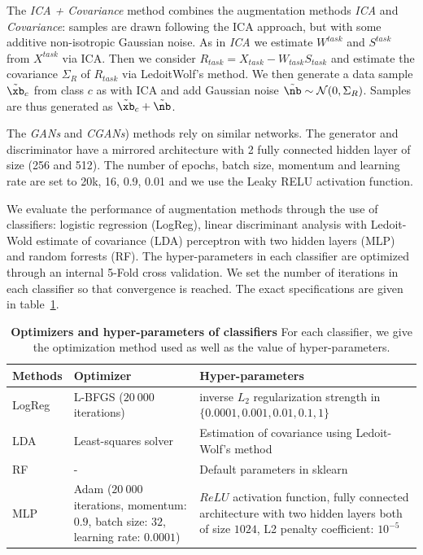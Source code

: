 The \emph{ICA + Covariance} method combines the augmentation
methods \emph{ICA} and \emph{Covariance}: samples are drawn following
the ICA approach, but with some additive non-isotropic Gaussian noise.
%
As in \emph{ICA} we estimate $W^{task}$ and $S^{task}$ from
$X^{task}$ via ICA.
%
Then we consider $R_{task} = X_{task} - W_{task} S_{task}$ and estimate the
covariance $\Sigma_R$ of $R_{task}$ via LedoitWolf's method.
%
We then generate a data sample $\tilde{\xb}_c$ from class $c$ as with ICA and add
Gaussian noise $\tilde{\nb} \sim \mathcal{N}(0,\Sigma_R)$.
%
Samples are thus generated as $\tilde{\xb}_c + \tilde{\nb}$.

The \emph{GANs} and \emph{CGANs}) methods rely on similar networks. The generator and discriminator have a mirrored architecture with 2 fully connected hidden layer of size (256 and 512).  The number of epochs, batch size, momentum and learning rate are set to 20k, 16, 0.9, 0.01 and we use the Leaky RELU activation function.

We evaluate the performance of augmentation methods through the use of classifiers: logistic regression (LogReg), linear
discriminant analysis with Ledoit-Wold estimate of covariance (LDA) perceptron
with two hidden layers (MLP) and random forrests (RF).
The hyper-parameters in each classifier are optimized through an internal 5-Fold
cross validation. We set the number of iterations in each classifier so that
convergence is reached. The exact specifications are given in table~\ref{fig:classifiers:tab}.

\begin{table}
  \begin{tabular}{ p{} | p{} |p{}}
\hline
  Methods & Optimizer & Hyper-parameters \\
  \hline
LogReg & L-BFGS \newline ($20~000$ iterations) & inverse $L_2$ regularization
strength \newline in $\{0.0001, 0.001, 0.01, 0.1, 1 \}$ \\
  \hline
LDA  & Least-squares solver & Estimation of covariance \newline using Ledoit-Wolf's
                              method \\
  \hline
  RF &  - &  Default parameters in sklearn \\
  \hline
MLP  & Adam \newline ($20~000$ iterations, \newline momentum: $0.9$, \newline
batch size: $32$, \newline learning
       rate: $0.0001$) & $ReLU$ activation function, fully connected
                         architecture with two hidden layers both of size $1024$, L2
                         penalty coefficient: $10^{-5}$
\caption{\textbf{Optimizers and hyper-parameters of classifiers} For each classifier, we give the optimization method used as well as the value of hyper-parameters.}\label{fig:classifiers:tab} 
\end{tabular}
\end{table}


